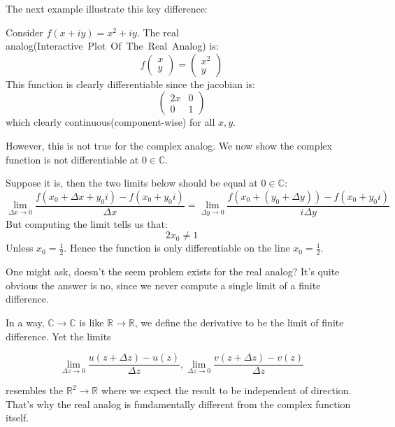 The next example illustrate this key difference:

\begin{example}Consider $f(x+iy)=x^2 + iy$. The real analog(Interactive~Plot~Of~The~Real~Analog) is:
\begin{equation}
f\begin{pmatrix}
x \\
y
\end{pmatrix}= 
\begin{pmatrix}
x^2 \\
y
\end{pmatrix}
\end{equation}
This function is clearly differentiable since the jacobian is:
\begin{equation}
\begin{pmatrix}
2x & 0 \\
0 & 1
\end{pmatrix}
\end{equation}
which clearly continuous(component-wise) for all $x,y$.

However, this is not true for the complex analog. We now show the complex function is not differentiable at $0\in \mathbb{C}$.

Suppose it is, then the two limits below should be equal at $0\in \mathbb{C}$:
\begin{equation}
\label{complex_derivative_limit}
\lim_{\Delta x\to 0}\frac{f(x_0 + \Delta x + y_0i) -f(x_0 + y_0 i)}{\Delta x} = \lim_{\Delta y\to 0}\frac{f(x_0 + (y_0 +\Delta y)) -f(x_0 + y_0 i)}{i\Delta y }
\end{equation}
But computing the limit tells us that:
\begin{equation}
2x_0 \neq 1
\end{equation}
Unless $x_0 = \frac{1}{2}$. Hence the function is only differentiable on the line $x_0=\frac12$.

One might ask, doesn't the seem problem exists for the real analog? It's quite obvious the answer is no, since we never compute a single limit of a finite difference.

In a way, $\mathbb{C} \to \mathbb{C}$ is like $\mathbb{R}\to \mathbb{R}$, we define the derivative to be the limit of finite difference. Yet the limits

\begin{equation}
\lim_{\Delta z\to 0}\frac{u(z+\Delta z) -u(z)}{\Delta z}, \lim_{\Delta z\to 0}\frac{v(z+\Delta z) -v(z)}{\Delta z}
\end{equation}

resembles the $\mathbb{R}^2 \to \mathbb{R}$ where we expect the result to be independent of direction. That's why the real analog is fundamentally different from the complex function itself.

\end{example}

